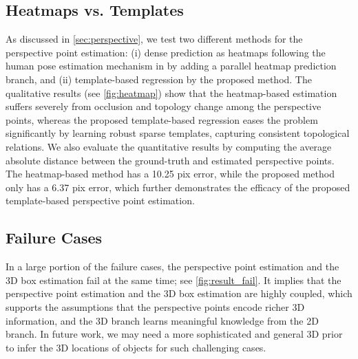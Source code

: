 \documentclass{article}
\begin{document}
\begin{table}[b!]
    \caption{Ablative analysis of the proposed model on SUN RGB-D. We evaluate the mAP for 3D object detection.}
    \setlength{\tabcolsep}{16pt}
    \centering
    \label{tab:analysis}
\end{table}

\subsection{Heatmaps vs. Templates}

As discussed in \autoref{sec:perspective}, we test two different methods for the perspective point estimation: (i) dense prediction as heatmaps following the human pose estimation mechanism in \citet{he2017mask} by adding a parallel heatmap prediction branch, and (ii) template-based regression by the proposed method. The qualitative results (see \autoref{fig:heatmap}) show that the heatmap-based estimation suffers severely from occlusion and topology change among the perspective points, whereas the proposed template-based regression eases the problem significantly by learning robust sparse templates, capturing consistent topological relations. We also evaluate the quantitative results by computing the average absolute distance between the ground-truth and estimated perspective points. The heatmap-based method has a 10.25 pix error, while the proposed method only has a 6.37 pix error, which further demonstrates the efficacy of the proposed template-based perspective point estimation.


\subsection{Failure Cases}

In a large portion of the failure cases, the perspective point estimation and the 3D box estimation fail at the same time; see \autoref{fig:result_fail}. It implies that the perspective point estimation and the 3D box estimation are highly coupled, which supports the assumptions that the perspective points encode richer 3D information, and the 3D branch learns meaningful knowledge from the 2D branch. In future work, we may need a more sophisticated and general 3D prior to infer the 3D locations of objects for such challenging cases.
\end{document}

